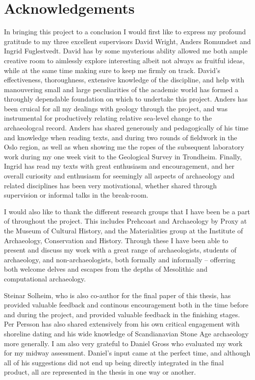 \pagestyle{plain}
\setcounter{page}{3}

\section*{Acknowledgements}
In bringing this project to a conclusion I would first like to express my profound gratitude to my three excellent supervisors David Wright, Anders Romundset and Ingrid Fuglestvedt. David has by some mysterious ability allowed me both ample creative room to aimlessly explore interesting albeit not always as fruitful ideas, while at the same time making sure to keep me firmly on track. David's effectiveness, thoroughness, extensive knowledge of the discipline, and help with manouvering small and large peculiarities of the academic world has formed a throughly dependable foundation on which to undertake this project. Anders has been cruical for all my dealings with geology through the project, and was instrumental for productively relating relative sea-level change to the archaeologcal record. Anders has shared generously and pedagogically of his time and knowledge when reading texts, and during two rounds of fieldwork in the Oslo region, as well as when showing me the ropes of the subsequent laboratory work during my one week visit to the Geological Survey in Trondheim. Finally, Ingrid has read my texts with great enthusiasm and encouragement, and her overall curiosity and enthusiasm for seemingly all aspects of archaeology and related disciplines has been very motivational, whether shared through supervision or informal talks in the break-room.  

I would also like to thank the different research groups that I have been be a part of throughout the project. This includes Prehcoast and Archaeology by Proxy at the Museum of Cultural History, and the Materialities group at the Institute of Archaeology, Conservation and History. Through these I have been able to present and discuss my work with a great range of archaeologists, students of archaeology, and non-archaeologists, both formally and informally -- offerring both welcome delves and escapes from the depths of Mesolithic and computational archaeology.

Steinar Solheim, who is also co-author for the final paper of this thesis, has provided valuable feedback and continous encouragement both in the time before and during the project, and provided valuable feedback in the finishing stages. Per Persson has also shared extensively from his own critical engagement with shoreline dating and his wide knowledge of Scandianavian Stone Age archaeology more generally. I am also very grateful to Daniel Gross who evaluated my work for my midway assessment. Daniel's input came at the perfect time, and although all of his suggestions did not end up being directly integrated in the final product, all are represented in the thesis in one way or another.

